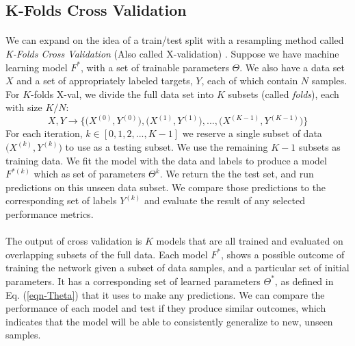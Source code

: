 \documentclass[12pt,letterpaper]{article}
\begin{document}

\subsection{K-Folds Cross Validation}
\label{subsec-XValidation}

\paragraph*{}We can expand on the idea of a train/test split with a resampling method called \textit{K-Folds Cross Validation} (Also called X-validation) \cite{Geron,James}. Suppose we have machine learning model $F^*$, with a set of trainable parameters $\Theta$. We also have a data set $X$ and a set of appropriately labeled targets, $Y$, each of which contain $N$ samples. For $K$-folds X-val, we divide the full data set into $K$ subsets (called \textit{folds}), each with size $K/N$:
\begin{equation}
\label{eqn-XValSplit}
X,Y \rightarrow \Big\{ \big(X^{(0)},Y^{(0)}\big) , \big(X^{(1)},Y^{(1)}\big) , ... , \big(X^{(K-1)},Y^{(K-1)}\big) \Big\}
\end{equation}
For each iteration, $k \in [0,1,2,...,K-1]$ we reserve a single subset of data $\big(X^{(k)},Y^{(k)}\big)$ to use as a testing subset. We use the remaining $K-1$ subsets as training data. We fit the model with the data and labels to produce a model $F^{*(k)}$ which as set of parameters $\Theta^{k}$. We return the the test set, and run predictions on this unseen data subset. We compare those predictions to the corresponding set of labels $Y^{(k)}$ and evaluate the result of any selected performance metrics.

\paragraph*{}The output of cross validation is $K$ models that are all trained and evaluated on overlapping subsets of the full data. Each model $F^*$, shows a possible outcome of training the network given a subset of data samples, and a particular set of initial parameters. It has a corresponding set of learned parameters $\Theta^*$, as defined in Eq. (\ref{eqn-Theta}) that it uses to make any predictions. We can compare the performance of each model and test if they produce similar outcomes, which indicates that the model will be able to consistently generalize to new, unseen samples.
\end{document}
